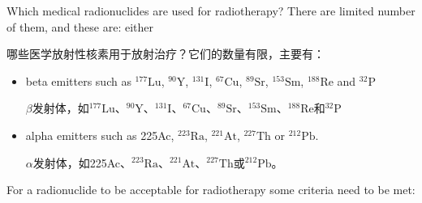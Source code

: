 \documentclass[dvipsnames, svgnames,a4paper,11pt]{article}
\begin{document}
Which medical radionuclides are used for radiotherapy? There are limited number of them, and these are: either

哪些医学放射性核素用于放射治疗？它们的数量有限，主要有：
\begin{itemize}
      \item beta emitters such as ${}^\text{177}\text{Lu}$, ${}^\text{90}\text{Y}$, ${}^\text{131}\text{I}$, ${}^\text{67}\text{Cu}$, ${}^\text{89}\text{Sr}$, ${}^\text{153}\text{Sm}$, ${}^\text{188}\text{Re}$ and ${}^\text{32}\text{P}$

            $\beta$发射体，如${}^\text{177}\text{Lu}$、${}^\text{90}\text{Y}$、${}^\text{131}\text{I}$、${}^\text{67}\text{Cu}$、${}^\text{89}\text{Sr}$、${}^\text{153}\text{Sm}$、${}^\text{188}\text{Re}$和${}^\text{32}\text{P}$
      \item alpha emitters such as 225Ac, ${}^\text{223}\text{Ra}$, ${}^{221}\text{At}$, ${}^{227}\text{Th}$ or ${}^{212}\text{Pb}$.

            $\alpha$发射体，如225Ac、${}^\text{223}\text{Ra}$、${}^{221}\text{At}$、${}^{227}\text{Th}$或${}^{212}\text{Pb}$。
\end{itemize}

For a radionuclide to be acceptable for radiotherapy some criteria need to be met:
\end{document}
